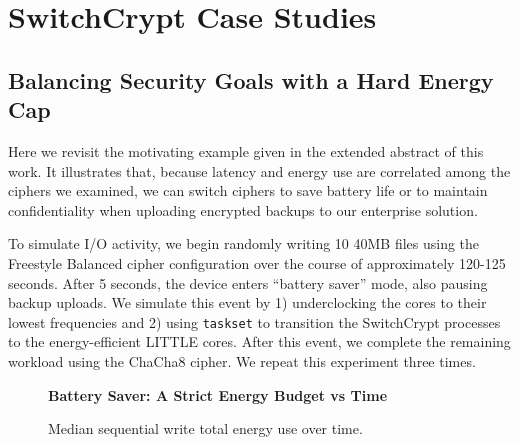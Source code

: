 \section{SwitchCrypt Case Studies} \label{sec:usecases}


\subsection{Balancing Security Goals with a Hard Energy Cap} \label{subsec:uc1}

Here we revisit the motivating example given in the extended abstract
of this work. It illustrates that, because latency and energy use are
correlated among the ciphers we examined, we can switch ciphers to
save battery life or to maintain confidentiality when uploading
encrypted backups to our enterprise solution. 

To simulate I/O activity, we begin randomly writing 10 40MB files
using the Freestyle Balanced cipher configuration over the course of
approximately 120-125 seconds. After 5 seconds, the device enters
``battery saver'' mode, also pausing backup uploads. We simulate this
event by 1) underclocking the cores to their lowest frequencies and 2)
using \texttt{taskset} to transition the SwitchCrypt processes to the
energy-efficient LITTLE cores. After this event, we complete the
remaining workload using the ChaCha8 cipher. We repeat this experiment
three times. 

\begin{figure}[ht] \textbf{Battery Saver: A Strict Energy
   Budget vs Time}\par\medskip
   \centering
   {} \caption{Median sequential write total
   energy use over time.}
  \label{fig:usecase-battery}
\end{figure}

